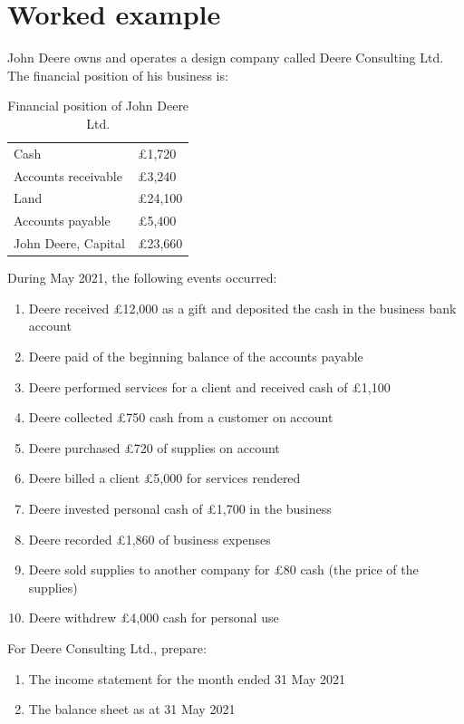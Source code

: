 \section{Worked example}
John Deere owns and operates a design company called Deere Consulting Ltd. The financial position of his business is:
\begin{table}[H]
    \centering
    \begin{tabular}[]{@{}ll@{}}
        \toprule
        Cash                & \pounds 1,720  \\
        Accounts receivable & \pounds 3,240  \\
        Land                & \pounds 24,100 \\
        Accounts payable    & \pounds 5,400  \\
        John Deere, Capital & \pounds 23,660 \\
        \bottomrule
    \end{tabular}
    \caption{Financial position of John Deere Ltd.}
\end{table}
During May 2021, the following events occurred:
\begin{enumerate}
    \item Deere received \pounds 12,000 as a gift and deposited the cash in the business bank account
    \item Deere paid of the beginning balance of the accounts payable
    \item Deere performed services for a client and received cash of \pounds 1,100
    \item Deere collected \pounds 750 cash from a customer on account
    \item Deere purchased \pounds 720 of supplies on account
    \item Deere billed a client \pounds 5,000 for services rendered
    \item Deere invested personal cash of \pounds 1,700 in the business
    \item Deere recorded \pounds 1,860 of business expenses
    \item Deere sold supplies to another company for \pounds 80 cash (the price of the supplies)
    \item Deere withdrew \pounds 4,000 cash for personal use
\end{enumerate}
For Deere Consulting Ltd., prepare:
\begin{enumerate}
    \item The income statement for the month ended 31 May 2021
    \item The balance sheet as at 31 May 2021
\end{enumerate}